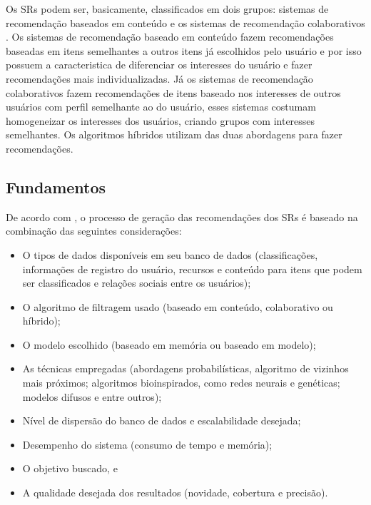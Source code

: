 Os SRs podem ser, basicamente, classificados em dois grupos: sistemas de recomendação baseados	
em conteúdo e os sistemas de recomendação colaborativos \cite{mauricio}. Os sistemas
de recomendação baseado em conteúdo fazem recomendações baseadas em itens semelhantes
a outros itens já escolhidos pelo usuário e por isso possuem a caracteristica de
diferenciar os interesses do usuário e fazer recomendações mais individualizadas. Já os 
sistemas de recomendação colaborativos fazem recomendações de itens baseado nos interesses 
de outros usuários com perfil semelhante ao do usuário, esses sistemas costumam homogeneizar
os interesses dos usuários, criando grupos com interesses semelhantes. Os algoritmos híbridos 
utilizam das duas abordagens para fazer recomendações.


\subsection{Fundamentos}

De acordo com , o processo de geração das recomendações dos SRs é baseado 
na combinação das seguintes considerações:


\begin{itemize}

	\item O tipos de dados disponíveis em seu banco de dados (classificações, informações de registro do usuário, recursos e conteúdo para itens que podem ser
	classificados e relações sociais entre os usuários); 

	\item O algoritmo de filtragem usado (baseado em conteúdo, colaborativo ou híbrido);

	\item O modelo escolhido (baseado em memória ou baseado em modelo);
	
	\item As técnicas empregadas (abordagens probabilísticas, algoritmo de vizinhos mais próximos;
	algoritmos bioinspirados, como redes neurais e genéticas; modelos difusos e entre outros);
	
	\item  Nível de dispersão do banco de dados e escalabilidade desejada;

	\item  Desempenho do sistema (consumo de tempo e memória);

	\item  O objetivo buscado, e

	\item A qualidade desejada dos resultados (novidade, cobertura e
   precisão).

\end{itemize}

